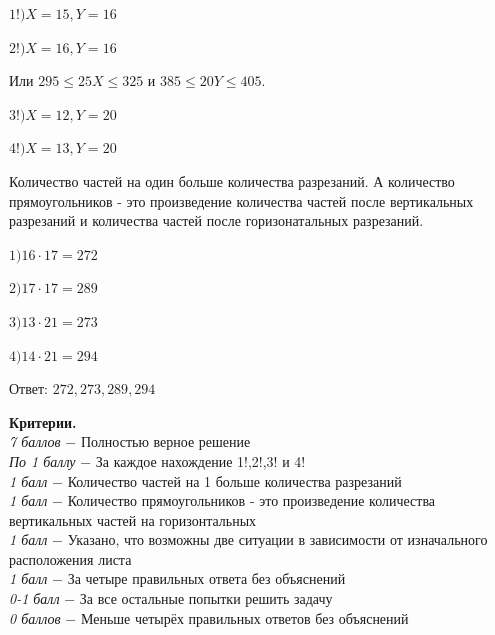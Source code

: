 $1!) X=15, Y=16$

$2!) X=16, Y=16$

Или $295	\leqslant 25X 	\leqslant 325$ и $385	\leqslant 20Y 	\leqslant 405$.

$3!) X=12, Y=20$

$4!) X=13, Y=20$

Количество частей на один больше количества разрезаний. А количество прямоугольников - это произведение количества частей после вертикальных разрезаний и количества частей после горизонатальных разрезаний.

$1) 16\cdot17=272$

$2) 17\cdot17=289$

$3) 13\cdot21=273$

$4) 14\cdot21=294$

Ответ: $272, 273, 289, 294$


\textbf{Критерии.} \\
\textit{7 баллов} $-$ Полностью верное решение\\
\textit{По 1 баллу} $-$ За каждое нахождение 1!,2!,3! и 4! \\ 
\textit{1 балл} $-$ Количество частей на 1 больше количества разрезаний\\
\textit{1 балл} $-$ Количество прямоугольников - это произведение количества вертикальных частей на горизонтальных\\
\textit{1 балл} $-$ Указано, что возможны две ситуации в зависимости от изначального расположения листа\\
\textit{1 балл} $-$  За четыре правильных ответа без объяснений\\ 
\textit{0-1 балл} $-$ За все остальные попытки решить задачу\\
\textit{0 баллов} $-$ Меньше четырёх правильных ответов без объяснений\\